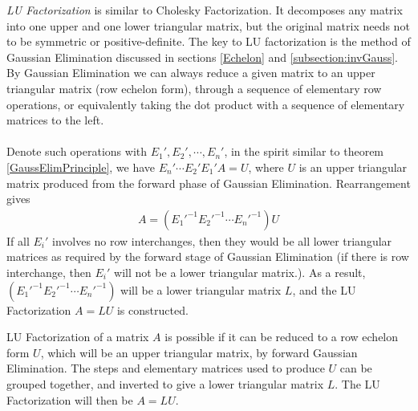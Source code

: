 \textit{LU Factorization} is similar to Cholesky Factorization. It decomposes any matrix into one upper and one lower triangular matrix, but the original matrix needs not to be symmetric or positive-definite. The key to LU factorization is the method of Gaussian Elimination discussed in sections \ref{Echelon} and \ref{subsection:invGauss}. By Gaussian Elimination we can always reduce a given matrix to an upper triangular matrix (row echelon form), through a sequence of elementary row operations, or equivalently taking the dot product with a sequence of elementary matrices to the left. \\
\\
Denote such operations with $E_1', E_2', \cdots, E_n'$, in the spirit similar to theorem \ref{GaussElimPrinciple}, we have $E_n'\cdots E_2'E_1'A = U$, where $U$ is an upper triangular matrix produced from the forward phase of Gaussian Elimination. Rearrangement gives
\begin{align*}
A = (E_1'^{-1}E_2'^{-1}\cdots E_n'^{-1})U    
\end{align*}
If all $E_i'$ involves no row interchanges, then they would be all lower triangular matrices as required by the forward stage of Gaussian Elimination (if there is row interchange, then $E_i'$ will not be a lower triangular matrix.). As a result, $(E_1'^{-1}E_2'^{-1}\cdots E_n'^{-1})$ will be a lower triangular matrix $L$, and the LU Factorization $A = LU$ is constructed.
\begin{thm}
LU Factorization of a matrix $A$ is possible if it can be reduced to a row echelon form $U$, which will be an upper triangular matrix, by forward Gaussian Elimination. The steps and elementary matrices used to produce $U$ can be grouped together, and inverted to give a lower triangular matrix $L$. The LU Factorization will then be $A = LU$.
\end{thm}

